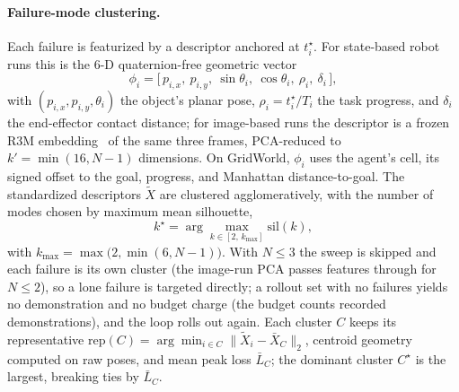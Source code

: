 \documentclass[letterpaper]{article} %
\begin{document}
\paragraph{Failure-mode clustering.}
Each failure is featurized by a descriptor anchored at $t^\star_i$. For
state-based robot runs this is the 6-D quaternion-free geometric vector
\begin{equation}
\phi_i=\big[\,p_{i,x},\ p_{i,y},\ \sin\theta_i,\ \cos\theta_i,\
\rho_i,\ \delta_i\,\big],
\label{eq:desc}
\end{equation}
with $(p_{i,x},p_{i,y},\theta_i)$ the object's planar pose,
$\rho_i=t^\star_i/T_i$ the task progress, and $\delta_i$ the end-effector
contact distance; for image-based runs the descriptor is a frozen R3M
embedding~\citep{nair2022r3m} of the same three frames, PCA-reduced to
$k'=\min(16,N{-}1)$ dimensions. On GridWorld, $\phi_i$ uses the agent's cell,
its signed offset to the goal, progress, and Manhattan distance-to-goal. The
standardized descriptors $\tilde X$ are clustered agglomeratively, with the
number of modes chosen by maximum mean silhouette,
\begin{equation}
k^\star=\arg\max_{k\in[2,\,k_{\max}]}\mathrm{sil}(k),
\label{eq:kstar}
\end{equation}
with $k_{\max}=\max\big(2,\min(6,N{-}1)\big)$. With $N\le 3$ the sweep is
skipped and each failure is its own cluster (the image-run PCA passes
features through for $N\le 2$), so a lone failure is targeted directly; a
rollout set with no failures yields no demonstration and no budget charge
(the budget counts recorded demonstrations), and the loop rolls out again.
Each cluster $C$ keeps its representative
$\mathrm{rep}(C)=\arg\min_{i\in C}\|\tilde X_i-\bar X_C\|_2$, centroid
geometry computed on raw poses, and mean peak loss $\bar L_C$; the dominant
cluster $C^\star$ is the largest, breaking ties by $\bar L_C$.
\end{document}
